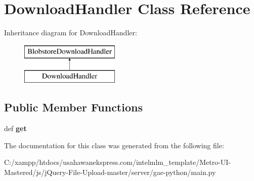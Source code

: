 \hypertarget{classmain_1_1_download_handler}{\section{Download\-Handler Class Reference}
\label{classmain_1_1_download_handler}
}
Inheritance diagram for Download\-Handler\-:\begin{figure}[H]
\begin{center}
\leavevmode
\includegraphics[height=2.000000cm]{classmain_1_1_download_handler}
\end{center}
\end{figure}
\subsection*{Public Member Functions}
\begin{DoxyCompactItemize}
\item 
\hypertarget{classmain_1_1_download_handler_a444a1328efb32d5d9d2dcb2efe855d3b}{def {\bfseries get}}\label{classmain_1_1_download_handler_a444a1328efb32d5d9d2dcb2efe855d3b}

\end{DoxyCompactItemize}


The documentation for this class was generated from the following file\-:\begin{DoxyCompactItemize}
\item 
C\-:/xampp/htdocs/usahawanekspress.\-com/intelmlm\-\_\-template/\-Metro-\/\-U\-I-\/\-Mastered/js/j\-Query-\/\-File-\/\-Upload-\/master/server/gae-\/python/main.\-py\end{DoxyCompactItemize}
